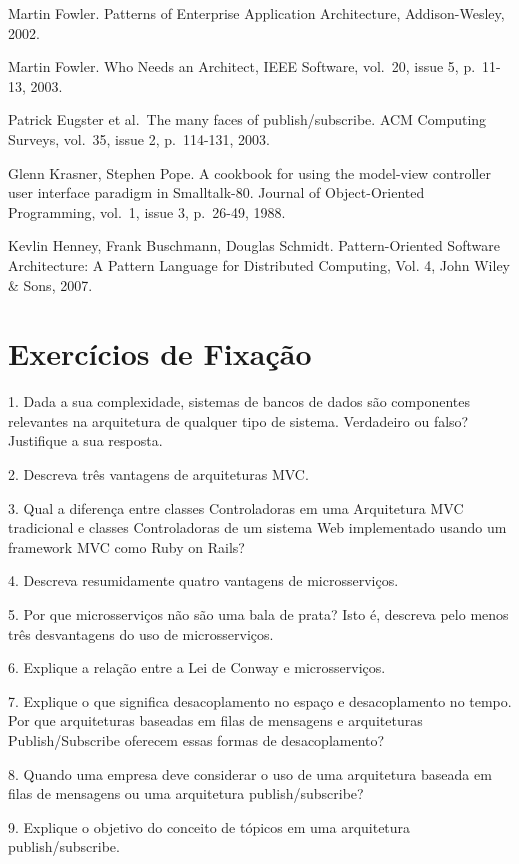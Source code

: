 \documentclass[
  11pt,
  twoside]{book}
\begin{document}
Martin Fowler. Patterns of Enterprise Application Architecture,
Addison-Wesley, 2002.

Martin Fowler. Who Needs an Architect, IEEE Software, vol.~20, issue 5,
p.~11-13, 2003.

Patrick Eugster et al.~The many faces of publish/subscribe. ACM
Computing Surveys, vol.~35, issue 2, p.~114-131, 2003.

Glenn Krasner, Stephen Pope. A cookbook for using the model-view
controller user interface paradigm in Smalltalk-80. Journal of
Object-Oriented Programming, vol.~1, issue 3, p.~26-49, 1988.

Kevlin Henney, Frank Buschmann, Douglas Schmidt. Pattern-Oriented
Software Architecture: A Pattern Language for Distributed Computing,
Vol. 4, John Wiley \& Sons, 2007.

\hypertarget{exercuxedcios-de-fixauxe7uxe3o-6}{%
\section*{Exercícios de
Fixação}\label{exercuxedcios-de-fixauxe7uxe3o-6}}

1. Dada a sua complexidade, sistemas de bancos de dados são componentes
relevantes na arquitetura de qualquer tipo de sistema. Verdadeiro ou
falso? Justifique a sua resposta.

2. Descreva três vantagens de arquiteturas MVC.

3. Qual a diferença entre classes Controladoras em uma Arquitetura MVC
tradicional e classes Controladoras de um sistema Web implementado
usando um framework MVC como Ruby on Rails?

4. Descreva resumidamente quatro vantagens de microsserviços.

5. Por que microsserviços não são uma bala de prata? Isto é, descreva
pelo menos três desvantagens do uso de microsserviços.

6. Explique a relação entre a Lei de Conway e microsserviços.

7. Explique o que significa desacoplamento no espaço e desacoplamento no
tempo. Por que arquiteturas baseadas em filas de mensagens e
arquiteturas Publish/Subscribe oferecem essas formas de desacoplamento?

8. Quando uma empresa deve considerar o uso de uma arquitetura baseada
em filas de mensagens ou uma arquitetura publish/subscribe?

9. Explique o objetivo do conceito de tópicos em uma arquitetura
publish/subscribe.
\end{document}
